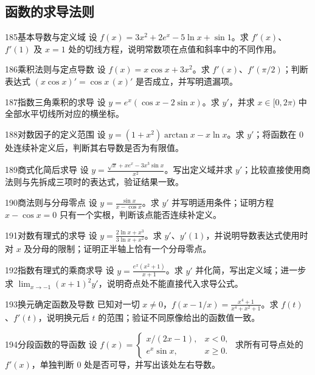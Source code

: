 \subsection{函数的求导法则}
\begin{exercise}{185}{基本导数与定义域}
设 $f(x)=3x^2+2e^x-5\ln x+\sin1$。求 $f'(x)$、$f'(1)$ 及 $x=1$ 处的切线方程，说明常数项在点值和斜率中的不同作用。
\end{exercise}
\begin{exercise}{186}{乘积法则与定点导数}
设 $f(x)=x\cos x+3x^2$。求 $f'(x)$、$f'(\pi/2)$；判断表达式 $(x\cos x)'=\cos x\,(x)'$ 是否成立，并写明遗漏项。
\end{exercise}
\begin{exercise}{187}{指数三角乘积的求导}
设 $y=e^x(\cos x-2\sin x)$。求 $y'$，并求 $x\in[0,2\pi)$ 中全部水平切线所对应的横坐标。
\end{exercise}
\begin{exercise}{188}{对数因子的定义范围}
设 $y=(1+x^2)\arctan x-x\ln x$。求 $y'$；将函数在 $0$ 处连续补定义后，判断其右导数是否为有限值。
\end{exercise}
\begin{exercise}{189}{商式化简后求导}
设 $y=\frac{\sqrt x+xe^x-3x^3\sin x}{x^2}$。写出定义域并求 $y'$；比较直接使用商法则与先拆成三项时的表达式，验证结果一致。
\end{exercise}
\begin{exercise}{190}{商法则与分母零点}
设 $y=\frac{\sin x}{x-\cos x}$。求 $y'$ 并写明适用条件；证明方程 $x-\cos x=0$ 只有一个实根，判断该点能否连续补定义。
\end{exercise}
\begin{exercise}{191}{对数有理式的求导}
设 $y=\frac{2\ln x+x^3}{3\ln x+x^2}$。求 $y'$、$y'(1)$，并说明导数表达式使用时对 $x$ 及分母的限制；证明正半轴上恰有一个分母零点。
\end{exercise}
\begin{exercise}{192}{指数有理式的乘商求导}
设 $y=\frac{e^x(x^2+1)}{x+1}$。求 $y'$ 并化简，写出定义域；进一步求 $\lim_{x\to-1}(x+1)^2y'$，说明奇点处不能直接代入求导公式。
\end{exercise}
\begin{exercise}{193}{换元确定函数及导数}
已知对一切 $x\ne0$，$f(x-1/x)=\frac{x^4+1}{x^4+x^2+1}$。求 $f(t)$、$f'(t)$，说明换元后 $t$ 的范围；验证不同原像给出的函数值一致。
\end{exercise}
\begin{exercise}{194}{分段函数的导函数}
设 $f(x)=\begin{cases}x/(2x-1),&x<0,\\e^x\sin x,&x\ge0.\end{cases}$ 求所有可导点处的 $f'(x)$，单独判断 $0$ 处是否可导，并写出该处左右导数。
\end{exercise}
